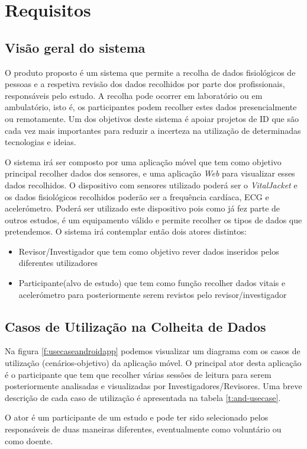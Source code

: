 \chapter{Requisitos}

\section{Visão geral do sistema}
O produto proposto é um sistema que permite a recolha de dados fisiológicos de pessoas e a respetiva revisão dos dados recolhidos por parte dos profissionais, responsáveis pelo estudo. A recolha pode ocorrer em laboratório ou em ambulatório, isto é, os participantes podem recolher estes dados presencialmente ou remotamente. Um dos objetivos deste sistema é apoiar projetos de \gls{ID} que são cada vez mais importantes para reduzir a incerteza na utilização de determinadas tecnologias e ideias.
\par 
O sistema irá ser composto por uma aplicação móvel que tem como objetivo principal recolher dados dos sensores, e uma aplicação \textit{Web} para visualizar esses dados recolhidos. O dispositivo com sensores utilizado poderá ser o \textit{VitalJacket} e os dados fisiológicos recolhidos poderão ser a frequência cardíaca, \gls{ECG} e acelerómetro. Poderá ser utilizado este dispositivo pois como já fez parte de outros estudos, é um equipamento válido e permite recolher os tipos de dados que pretendemos. O sistema irá contemplar então dois atores distintos:
\begin{itemize}
  \item Revisor/Investigador que tem como objetivo rever dados inseridos pelos diferentes utilizadores
  \item Participante(alvo de estudo) que tem como função recolher dados vitais e acelerómetro para posteriormente serem revistos pelo revisor/investigador
\end{itemize}
\newpage
\section{Casos de Utilização na Colheita de Dados}

Na figura \ref{f:usecaseandroidapp} podemos visualizar um diagrama com os casos de utilização (cenários-objetivo) da aplicação móvel. O principal ator desta aplicação é o participante que tem que recolher várias sessões de leitura para serem posteriormente analisadas e visualizadas por Investigadores/Revisores.  Uma breve descrição de cada caso de utilização é apresentada na tabela \ref{t:and-usecase}.
\par
O ator é um participante de um estudo e pode ter sido selecionado pelos responsáveis de duas maneiras diferentes, eventualmente como voluntário ou como doente. 

